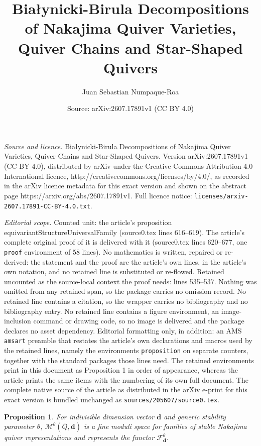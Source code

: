 \documentclass[10pt,a4paper]{amsart}
\title{Bia\l ynicki-Birula Decompositions of Nakajima Quiver Varieties, Quiver Chains and Star-Shaped Quivers}
\author{Juan Sebastian Numpaque-Roa}
\date{Source: arXiv:2607.17891v1 (CC BY 4.0)}
\newtheorem{proposition}{Proposition}
\begin{document}
\maketitle

\noindent\emph{Source and licence.} Bia\l ynicki-Birula Decompositions of Nakajima Quiver Varieties, Quiver Chains and Star-Shaped Quivers. Version arXiv:2607.17891v1 (CC BY 4.0), distributed by arXiv under the Creative Commons Attribution 4.0 International licence, http://creativecommons.org/licenses/by/4.0/, as recorded in the arXiv licence metadata for this exact version and shown on the abstract page https://arxiv.org/abs/2607.17891v1. Full licence notice: \texttt{licenses/arxiv-2607.17891-CC-BY-4.0.txt}.\par\smallskip

\noindent\textit{Editorial scope.} Counted unit: the article's proposition equivariantStructureUniversalFamily (source0.tex lines 616--619). The article's complete original proof of it is delivered with it (source0.tex lines 620--677, one \texttt{proof} environment of 58 lines). No mathematics is written, repaired or re-derived: the statement and the proof are the article's own lines, in the article's own notation, and no retained line is substituted or re-flowed.  Retained uncounted as the source-local context the proof needs: lines 535--537.  Nothing was omitted from any retained span, so the package carries no omission record.  No retained line contains a citation, so the wrapper carries no bibliography and no bibliography entry.  No retained line contains a figure environment, an image-inclusion command or drawing code, so no image is delivered and the package declares no asset dependency.  Editorial formatting only, in addition: an AMS \texttt{amsart} preamble that restates the article's own declarations and macros used by the retained lines, namely the environments \texttt{proposition} on separate counters, together with the standard packages those lines need.  The retained environments print in this document as Proposition 1 in order of appearance, whereas the article prints the same items with the numbering of its own full document.  The complete native source of the article as distributed in the arXiv e-print for this exact version is bundled unchanged as \texttt{sources/205607/source0.tex}.
	\begin{proposition}\label{existenceUniversalFamilyNakajimaQuiverVarieties}
		For indivisible dimension vector $\mathbf{d}$ and generic stability parameter $\theta$, $\mathcal{M}^{\theta}(\overline{Q},\mathbf{d})$ is a fine moduli space for families of stable Nakajima quiver representations and represents the functor $\mathcal{F}^{\theta}_{\mathbf{d}}$. 
	\end{proposition}
\end{document}
